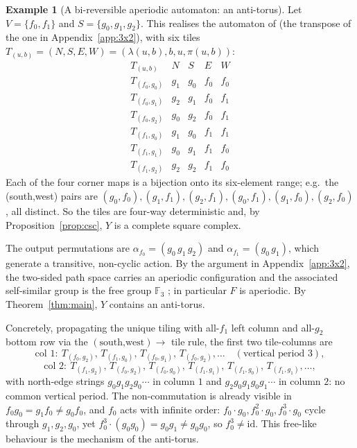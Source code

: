 \documentclass[11pt,reqno]{amsart}
\theoremstyle{plain}
\theoremstyle{definition}
\newtheorem{example}[theorem]{Example}
\begin{document}
\begin{example}[A bi-reversible aperiodic automaton: an anti-torus]\label{ex:53}
Let $V=\{f_0,f_1\}$ and $S=\{g_0,g_1,g_2\}$. This realises the automaton of
\cite[Example~4.1]{W} (the transpose of the one in Appendix~\ref{app:3x2}), with six
tiles $T_{(u,b)}=(N,S,E,W)=(\lambda(u,b),b,u,\pi(u,b))$:
\[
\begin{array}{c|cccc}
T_{(u,b)} & N & S & E & W\\\hline
T_{(f_0,g_0)} & g_1 & g_0 & f_0 & f_0\\
T_{(f_0,g_1)} & g_2 & g_1 & f_0 & f_1\\
T_{(f_0,g_2)} & g_0 & g_2 & f_0 & f_1\\
T_{(f_1,g_0)} & g_1 & g_0 & f_1 & f_1\\
T_{(f_1,g_1)} & g_0 & g_1 & f_1 & f_0\\
T_{(f_1,g_2)} & g_2 & g_2 & f_1 & f_0
\end{array}
\]
Each of the four corner maps is a bijection onto its six-element range; e.g.\ the
(south,west) pairs are
$(g_0,f_0),(g_1,f_1),(g_2,f_1),(g_0,f_1),(g_1,f_0),(g_2,f_0)$, all distinct.
So the tiles are four-way deterministic and, by Proposition~\ref{prop:csc}, $Y$ is
a complete square complex.

The output permutations are $\alpha_{f_0}=(g_0\,g_1\,g_2)$ and
$\alpha_{f_1}=(g_0\,g_1)$, which generate a transitive, non-cyclic action. By the
argument in Appendix~\ref{app:3x2}, the two-sided path space carries an aperiodic
configuration and the associated self-similar group is the free group $\mathbb{F}_3$
\cite{BGKMNSS}; in particular $F$ is aperiodic. By Theorem~\ref{thm:main}, $Y$
contains an anti-torus.

Concretely, propagating the unique tiling with all-$f_1$ left column and all-$g_2$
bottom row via the $(\text{south,west})\to$ tile rule, the first two tile-columns are
\[
\text{col }1:\ T_{(f_0,g_2)},\,T_{(f_1,g_0)},\,T_{(f_0,g_1)},\,T_{(f_0,g_2)},\dots
\quad(\text{vertical period }3),
\]
\[
\text{col }2:\ T_{(f_1,g_2)},\,T_{(f_0,g_2)},\,T_{(f_0,g_0)},\,T_{(f_1,g_1)},\,
T_{(f_1,g_0)},\,T_{(f_1,g_1)},\dots,
\]
with north-edge strings $g_0g_1g_2g_0\cdots$ in column $1$ and $g_2g_0g_1g_0g_1\cdots$
in column $2$: no common vertical period. The non-commutation is already visible in
$f_0g_0=g_1f_0\neq g_0f_0$, and $f_0$ acts with infinite order:
$f_0\!\cdot\!g_0,f_0^2\!\cdot\!g_0,f_0^3\!\cdot\!g_0$ cycle through $g_1,g_2,g_0$,
yet $f_0^3\!\cdot\!(g_0g_0)=g_0g_1\neq g_0g_0$, so $f_0^3\neq\mathrm{id}$. This
free-like behaviour is the mechanism of the anti-torus.
\end{example}
\end{document}
